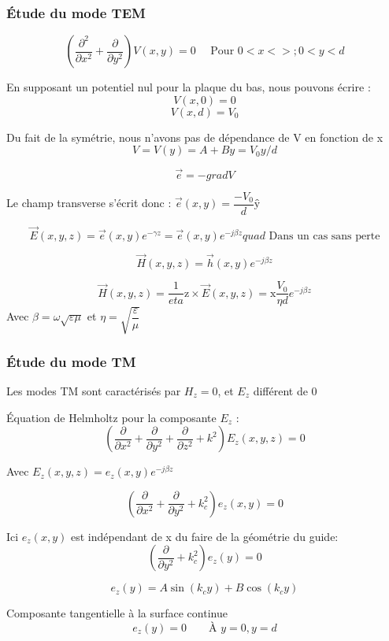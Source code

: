 \documentclass[12pt,a4paper]{report}
\begin{document}
\subsubsection{Étude du mode TEM}

\[
	\left ( \dfrac{\partial^2}{\partial x^2} + \dfrac{\partial}{\partial y^2} \right ) V(x,y) = 0 \quad \text{ Pour } 0< x < > ; 0 < y < d
\]

En supposant un potentiel nul pour la plaque du bas, nous pouvons écrire :
\[
	V(x,0) = 0
\]
\[
	V(x,d) = V_0
\]

Du fait de la symétrie, nous n'avons pas de dépendance de V en fonction de x
\[
	V = V(y) = A + By = V_0 y/d
\]

\[
	\vec{e} = -grad V
\]

Le champ transverse s'écrit donc : \(\vec{e}(x,y) = \dfrac{-V_0}{d}\text{\^y}\)

\[
	\vec{E}(x,y,z)=\vec{e}(x,y) e^{-\gamma z} = \vec{e}(x,y) e^{-j\beta z} quad \text{ Dans un cas sans perte} 
\]

\[
	\vec{H}(x,y,z) = \vec{h}(x,y) e^{-j\beta z}
\]

\[
	\vec{H}(x,y,z) = \dfrac{1}{eta} \text{\^z} \times \vec{E}(x,y,z) = \text{\^x} \dfrac{V_0}{\eta d} e^{-j\beta z}
\]
Avec \(\beta = \omega \sqrt{\varepsilon \mu}\) et \(\eta = \sqrt{\dfrac{\varepsilon}{\mu}}\)

\subsubsection{Étude du mode TM}

Les modes TM sont caractérisés par \(H_z = 0\), et \(E_z\) différent de 0

Équation de Helmholtz pour la composante \(E_z\) : 
\[
	\left ( \dfrac{\partial}{\partial x^2} + \dfrac{\partial}{\partial y^2} + \dfrac{\partial}{\partial z^2} + k^2\right ) E_z(x,y,z) = 0
\]

Avec \(E_z (x,y,z) = e_z(x,y) e^{-j\beta z}\)

\[
	\left ( \dfrac{\partial}{\partial x^2} + \dfrac{\partial}{\partial y^2} + k_c^2\right ) e_z(x,y) = 0
\]

Ici \(e_z(x,y)\) est indépendant de x du faire de la géométrie du guide:
\[
	\left ( \dfrac{\partial}{\partial y^2} + k_c^2\right ) e_z(y) = 0
\]

\[
	e_z(y) = A \sin(k_c y) + B \cos(k_c y)
\]

Composante tangentielle à la surface continue
\[
	e_z (y) = 0 \qquad \text{À } y=0, y=d
\]
\end{document}
